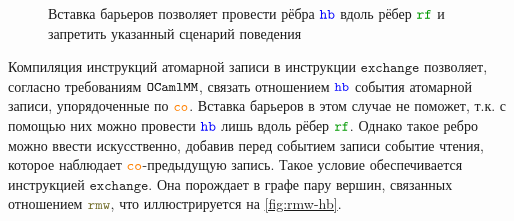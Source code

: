 \newcommand{\offsetfive}{2.5}
\begin{figure}[h]
  \centering
  \caption{Вставка барьеров позволяет провести рёбра $\lHB$ вдоль рёбер $\lRF$ и запретить указанный сценарий поведения}
  \label{fig:fences-hb}
\end{figure}


Компиляция инструкций атомарной записи в инструкции $\mathtt{exchange}$ позволяет, согласно требованиям $\mathtt{OCaml}\allowbreak \mathtt{MM}$, связать отношением $\lHB$ события атомарной записи, упорядоченные по $\lCO$. Вставка барьеров в этом случае не поможет, т.к. с помощью них можно провести $\lHB$ лишь вдоль рёбер $\lRF$. Однако такое ребро можно ввести искусственно, добавив перед событием записи событие чтения, которое наблюдает $\lCO$-предыдущую запись. Такое условие обеспечивается инструкцией $\mathtt{exchange}$. Она порождает в графе пару вершин, связанных отношением $\lRMW$, что иллюстрируется на \cref{fig:rmw-hb}.

